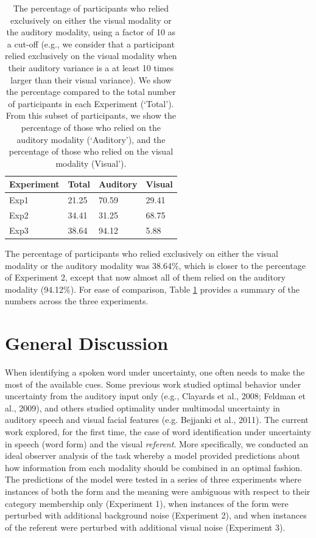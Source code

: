 \documentclass[english,floatsintext,man]{apa6}
\theoremstyle{definition}
\theoremstyle{definition}
\theoremstyle{definition}
\theoremstyle{remark}
\begin{document}
\begin{table}[tbp]
\begin{center}
\begin{threeparttable}
\caption{\label{tab:exclusive}The percentage of participants who relied exclusively on either the visual modality or the auditory modality, using a factor of 10 as a cut-off (e.g., we consider that a participant relied exclusively on the visual modality when their auditory variance is a at least 10 times larger than their visual variance). We show the percentage compared to the total number of participants in each Experiment (`Total'). From this subset of participants, we show the percentage of those who relied on the  auditory modality (`Auditory'), and the percentage of those who relied on the visual  modality (Visual').}
\begin{tabular}{llll}
\toprule
Experiment & \multicolumn{1}{c}{Total} & \multicolumn{1}{c}{Auditory} & \multicolumn{1}{c}{Visual}\\
\midrule
Exp1 & 21.25 & 70.59 & 29.41\\
Exp2 & 34.41 & 31.25 & 68.75\\
Exp3 & 38.64 & 94.12 & 5.88\\
\bottomrule
\end{tabular}
\end{threeparttable}
\end{center}
\end{table}

The percentage of participants who relied exclusively on either the
visual modality or the auditory modality was 38.64\%, which is closer to
the percentage of Experiment 2, except that now almost all of them
relied on the auditory modality (94.12\%). For ease of comparison, Table
\ref{tab:exclusive} provides a summary of the numbers across the three
experiments.

\section{General Discussion}\label{general-discussion}

When identifying a spoken word under uncertainty, one often needs to
make the most of the available cues. Some previous work studied optimal
behavior under uncertainty from the auditory input only (e.g., Clayards
et al., 2008; Feldman et al., 2009), and others studied optimality under
multimodal uncertainty in auditory speech and visual facial features
(e.g. Bejjanki et al., 2011). The current work explored, for the first
time, the case of word identification under uncertainty in speech (word
form) and the visual \emph{referent}. More specifically, we conducted an
ideal observer analysis of the task whereby a model provided predictions
about how information from each modality should be combined in an
optimal fashion. The predictions of the model were tested in a series of
three experiments where instances of both the form and the meaning were
ambiguous with respect to their category membership only (Experiment 1),
when instances of the form were perturbed with additional background
noise (Experiment 2), and when instances of the referent were perturbed
with additional visual noise (Experiment 3).
\end{document}
